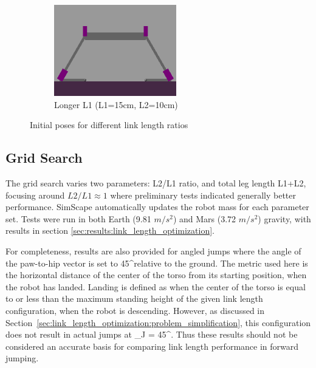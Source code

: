 \begin{figure}[h]
\begin{subfigure}[b]{0.32\textwidth}
    \end{subfigure}
    \hfill
    \begin{subfigure}[b]{0.32\textwidth}
        \centering
        \includegraphics[width=\textwidth]{Images/link_length_optimization/longer_L1_pose.png}
        \caption{Longer L1 (L1=15cm, L2=10cm)}
        \label{fig:link_length_optimization:longer_L1_pose}
    \end{subfigure}
    \caption{Initial poses for different link length ratios}
    \label{fig:link_length_optimization:initial_poses}
\end{figure}



\subsection{Grid Search}
The grid search varies two parameters: L2/L1 ratio, and total leg length L1+L2, focusing around $L2/L1\approx1$ where preliminary tests indicated generally better performance. SimScape automatically updates the robot mass for each parameter set. Tests were run in both Earth (9.81 $m/s^2$) and Mars (3.72 $m/s^2$) gravity, with results in section \ref{sec:results:link_length_optimization}.

For completeness, results are also provided for angled jumps where the angle of the paw-to-hip vector is set to 45^\circ relative to the ground. The metric used here is the horizontal distance of the center of the torso from its starting position, when the robot has landed. Landing is defined as when the center of the torso is equal to or less than the maximum standing height of the given link length configuration, when the robot is descending. However, as discussed in Section~\ref{sec:link_length_optimization:problem_simplification}, this configuration does not result in actual jumps at \theta_J = 45^\circ. Thus these results should not be considered an accurate basis for comparing link length performance in forward jumping.